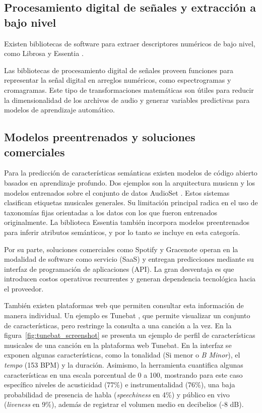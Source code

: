\subsection{Procesamiento digital de señales y extracción a bajo nivel}

Existen bibliotecas de software para extraer descriptores numéricos de bajo nivel, como Librosa \citep{librosa} y Essentia \citep{essentia}. 

Las bibliotecas de procesamiento digital de señales proveen funciones para representar la señal digital en arreglos numéricos, como espectrogramas y cromagramas. Este tipo de transformaciones matemáticas son útiles para reducir la dimensionalidad de los archivos de audio y generar variables predictivas para modelos de aprendizaje automático.

\subsection{Modelos preentrenados y soluciones comerciales}

Para la predicción de características semánticas existen modelos de código abierto basados en aprendizaje profundo. Dos ejemplos son la arquitectura musicnn \citep{musicnn} y los modelos entrenados sobre el conjunto de datos AudioSet \citep{audioset}. Estos sistemas clasifican etiquetas musicales generales. Su limitación principal radica en el uso de taxonomías fijas orientadas a los datos con los que fueron entrenados originalmente.
La biblioteca Essentia también incorpora modelos preentrenados para inferir atributos semánticos, y por lo tanto se incluye en esta categoría.

Por su parte, soluciones comerciales como Spotify \citep{spotify} y Gracenote \citep{gracenote} operan en la modalidad de software como servicio (SaaS) y entregan predicciones mediante su interfaz de programación de aplicaciones (API). La gran desventaja es que introducen costos operativos recurrentes y generan dependencia tecnológica hacia el proveedor.

También existen plataformas web que permiten consultar esta información de manera individual. Un ejemplo es Tunebat \citep{Tunebat}, que permite visualizar un conjunto de características, pero restringe la consulta a una canción a la vez. En la figura~\ref{fig:tunebat_screenshot} se presenta un ejemplo de perfil de características musicales de una canción en la plataforma web Tunebat.
En la interfaz se exponen algunas características, como la tonalidad (Si menor o \textit{B Minor}), el \textit{tempo} (153 BPM) y la duración. Asimismo, la herramienta cuantifica algunas características en una escala porcentual de 0 a 100, mostrando para este caso específico niveles de acusticidad (77\%) e instrumentalidad (76\%), una baja probabilidad de presencia de habla (\textit{speechiness} en 4\%) y público en vivo (\textit{liveness} en 9\%), además de registrar el volumen medio en decibelios (-8 dB).

